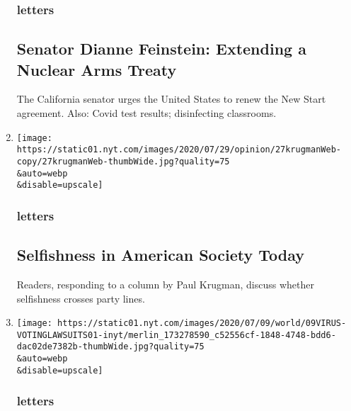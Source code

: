 \begin{enumerate}
  \hypertarget{letters-2}{%
  \subsubsection{letters}\label{letters-2}}

  \hypertarget{senator-dianne-feinstein-extending-a-nuclear-arms-treaty}{%
  \subsection{Senator Dianne Feinstein: Extending a Nuclear Arms
  Treaty}\label{senator-dianne-feinstein-extending-a-nuclear-arms-treaty}}

  The California senator urges the United States to renew the New Start
  agreement. Also: Covid test results; disinfecting classrooms.
\item
  \href{/2020/08/03/opinion/letters/selfishness-society.html}{}

  \texttt{[image: https://static01.nyt.com/images/2020/07/29/opinion/27krugmanWeb-copy/27krugmanWeb-thumbWide.jpg?quality=75\\\&auto=webp\\\&disable=upscale]}

  \hypertarget{letters-3}{%
  \subsubsection{letters}\label{letters-3}}

  \hypertarget{selfishness-in-american-society-today}{%
  \subsection{Selfishness in American Society
  Today}\label{selfishness-in-american-society-today}}

  Readers, responding to a column by Paul Krugman, discuss whether
  selfishness crosses party lines.
\item
  \href{/2020/08/02/opinion/letters/voting-election.html}{}

  \texttt{[image: https://static01.nyt.com/images/2020/07/09/world/09VIRUS-VOTINGLAWSUITS01-inyt/merlin\_173278590\_c52556cf-1848-4748-bdd6-dac02de7382b-thumbWide.jpg?quality=75\\\&auto=webp\\\&disable=upscale]}

  \hypertarget{letters-4}{%
  \subsubsection{letters}\label{letters-4}}

  \hypertarget{to-ensure-that-our-election-is-fair-and-open}{%
}
\end{enumerate}
